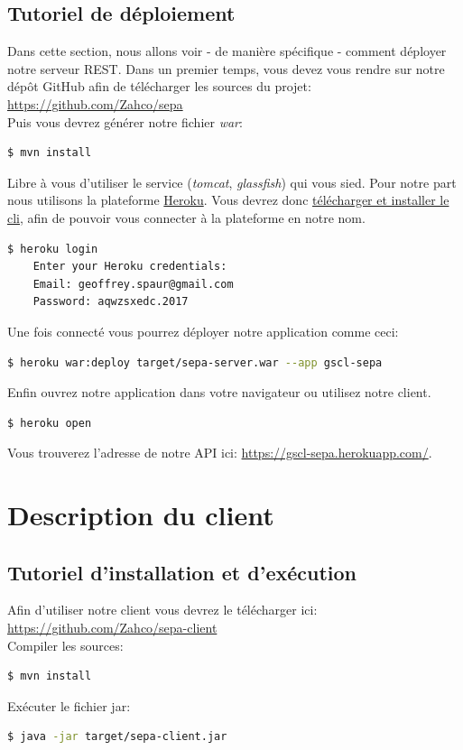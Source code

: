 \documentclass{article}
\begin{document}
    \subsection{Tutoriel de déploiement}
      Dans cette section, nous allons voir - de manière spécifique - comment déployer notre serveur REST.
      Dans un premier temps, vous devez vous rendre sur notre dépôt GitHub afin de télécharger les sources du projet:\\
      \url{https://github.com/Zahco/sepa}\\
      Puis vous devrez générer notre fichier \emph{war}:
      \begin{lstlisting}[language=bash]
    $ mvn install
      \end{lstlisting}
      Libre à vous d'utiliser le service (\emph{tomcat}, \emph{glassfish}) qui vous sied. Pour notre part nous utilisons la plateforme \href{https://www.heroku.com}{Heroku}.
      Vous devrez donc \href{https://devcenter.heroku.com/articles/heroku-cli}{télécharger et installer le cli}, afin de pouvoir vous connecter à la plateforme en notre nom.
      \begin{lstlisting}[language=bash]
    $ heroku login
    Enter your Heroku credentials:
    Email: geoffrey.spaur@gmail.com
    Password: aqwzsxedc.2017
      \end{lstlisting}
      Une fois connecté vous pourrez déployer notre application comme ceci:
      \begin{lstlisting}[language=bash]
    $ heroku war:deploy target/sepa-server.war --app gscl-sepa
      \end{lstlisting}
      Enfin ouvrez notre application dans votre navigateur ou utilisez notre client.
      \begin{lstlisting}[language=bash]
    $ heroku open
      \end{lstlisting}
      Vous trouverez l’adresse de notre API ici: \url{https://gscl-sepa.herokuapp.com/}.

  \newpage

  \section{ Description du client}
    \subsection{Tutoriel d'installation et d’exécution}
      Afin d'utiliser notre client vous devrez le télécharger ici:\\
      \url{https://github.com/Zahco/sepa-client}\\
      Compiler les sources: 
      \begin{lstlisting}[language=bash]
    $ mvn install
      \end{lstlisting}
      Exécuter le fichier jar:
      \begin{lstlisting}[language=bash]
    $ java -jar target/sepa-client.jar
      \end{lstlisting}
\end{document}
